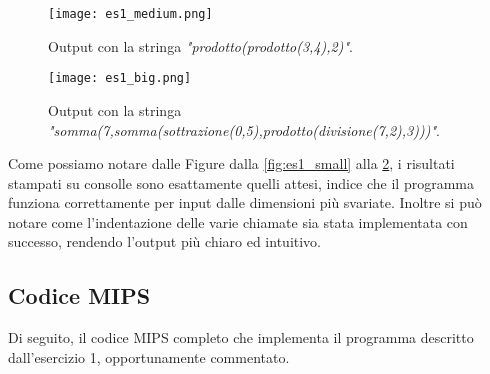        	\begin{figure}[h!]
       		\begin{center}
       			\texttt{[image: es1\_medium.png]}
       		\end{center}
       		\caption{Output con la stringa \textit{"prodotto(prodotto(3,4),2)"}.}
       		\label{fig:es1_medium}
       	\end{figure}
       	
       	\begin{figure}[h!]
       		\begin{center}
       			\texttt{[image: es1\_big.png]}
       		\end{center}
       		\caption{Output con la stringa \textit{"somma(7,somma(sottrazione(0,5),prodotto(divisione(7,2),3)))"}.}
       		\label{fig:es1_big}
       	\end{figure}
       	
       	Come possiamo notare dalle Figure dalla \ref{fig:es1_small} alla \ref{fig:es1_big}, i risultati stampati su consolle sono esattamente quelli attesi, indice che il programma funziona correttamente per input dalle dimensioni più svariate. Inoltre si può notare come l'indentazione delle varie chiamate sia stata implementata con successo, rendendo l'output più chiaro ed intuitivo.
       	
       	\FloatBarrier
       	
    \subsection*{Codice MIPS}
		
		Di seguito, il codice MIPS completo che implementa il programma descritto dall'esercizio 1, opportunamente commentato.
		
